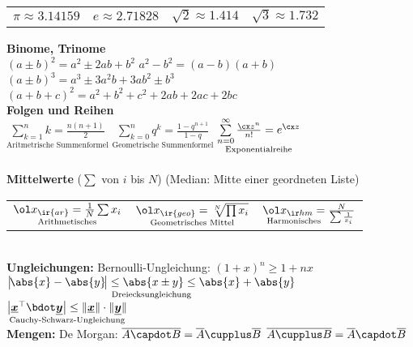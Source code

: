 \documentclass[english]{latex4ei/latex4ei_sheet}
\renewcommand{\vec}[1]{\underline{\boldsymbol{#1}}}
\begin{document}
\begin{sectionbox}
	\begin{tabular}{@{}llll}
		$\pi \approx \num{3,14159}$ & $e \approx \num{2,71828}$ & $\sqrt{2} \approx \num{1,414}$ & $\sqrt{3} \approx \num{1,732}$ \\
	\end{tabular}

	\textbf{Binome, Trinome}\\
	$(a\pm b)^2 = a^2 \pm 2ab + b^2$ \hfill $a^2 - b^2 = (a-b)(a+b)$\\
	$(a \pm b)^3 = a^3 \pm 3a^2b + 3ab^2 \pm b^3$\\
	$(a+b+c)^2 = a^2 + b^2 + c^2 + 2ab + 2ac + 2bc$
	\\[0.5em]
	\textbf{Folgen und Reihen}\\
	$\underset{\text{Aritmetrische Summenformel}}{\sum \limits_{k=1}^{n} k = \frac{n (n+1)}{2}}$ \quad $\underset{\text{Geometrische Summenformel}}{\sum \limits_{k=0}^{n} q^k = \frac{1 - q^{n+1}}{1-q}}$ \quad $\underset{\text{Exponentialreihe}}{\sum\limits_{n = 0}^{\infty} \frac{\cx z^n}{n!} = e^{\cx z}}$\\
	\\[0.5em]
	\textbf{Mittelwerte} \quad ($\sum$ von $i$ bis $N$) \hfill {\small (Median: Mitte einer geordneten Liste)}\\
	\begin{tabular*}{\columnwidth}{@{\extracolsep\fill}l@{\quad\ $\ge$}l@{\quad\ $\ge$}l}
	$\underset{\text{Arithmetisches}}{\ol x_{\ir{ar}} = \frac{1}{N} \sum x_i}$ & $\underset{\text{Geometrisches Mittel}}{\ol x_{\ir{geo}} = \sqrt[N]{ \prod x_i }}$ & $\underset{\text{Harmonisches}}{\ol x_{\ir hm} = }\frac{N}{\sum \frac{1}{x_i}}$\\
	\end{tabular*}
	\\[0.5em]
	\textbf{Ungleichungen:} \hfill Bernoulli-Ungleichung:  $(1+x)^n \ge 1+nx$\\
	$\underset{\text{Dreiecksungleichung}}{\big|\! \abs{x}- \abs{y}\!\big| \le \abs{x \pm y} \le \abs{x} + \abs{y}}$ \hfill
	$\underset{\text{Cauchy-Schwarz-Ungleichung}}{\left| \vec x^\top \bdot \vec y \right| \le \| \vec x\| \cdot \| \vec y\|}$
	\\[0.5em]
	\textbf{Mengen:} De Morgan: $\overline{A \capdot B} = \overline{A} \cupplus \overline{B}$ \hfill $\overline{A \cupplus B} = \overline{A} \capdot \overline{B}$
\end{sectionbox}
\end{document}
